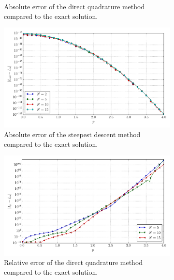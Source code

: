 \documentclass[a4paper,10pt]{article}
\begin{document}
\begin{figure}[ht!]
\begin{subfigure}[t]{0.5\linewidth}
    \caption{Absolute error of the direct quadrature method compared to the exact solution.}
    \label{fig:tp_4d_conv_p_0000_0000_err_qr}
  \end{subfigure}
  \begin{subfigure}[t]{0.5\linewidth}
    \includegraphics[width=\linewidth]{./plots/tp_4d_conv_p_(0,0,0,0)_(0,0,0,0)_err_nsd.pdf}
    \caption{Absolute error of the steepest descent method compared to the exact solution.}
    \label{fig:tp_4d_conv_p_0000_0000_err_nsd}
  \end{subfigure}
  \begin{subfigure}[t]{0.5\linewidth}
    \includegraphics[width=\linewidth]{./plots/tp_4d_conv_p_(0,0,0,0)_(0,0,0,0)_err_rel_qr.pdf}
    \caption{Relative error of the direct quadrature method compared to the exact solution.}
    \label{fig:tp_4d_conv_p_0000_0000_err_qr}
  \end{subfigure}
  \begin{subfigure}[t]{0.5\linewidth}

\end{subfigure}
\end{figure}
\end{document}
